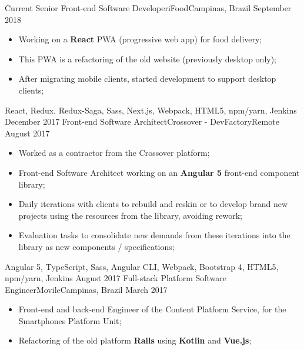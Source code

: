%
%
%

\begin{experiences}
  \experience
    {Current}   {Senior Front-end Software Developer}{iFood}{Campinas, Brazil}
    {September 2018} {
    \begin{itemize}
      \item Working on a \textbf{React} PWA (progressive web app) for food delivery;
      \item This PWA is a refactoring of the old website (previously desktop only);
      \item After migrating mobile clients, started development to support desktop clients;
    \end{itemize}
  }
  {React, Redux, Redux-Saga, Sass, Next.js, Webpack, HTML5, npm/yarn, Jenkins}
  \emptySeparator
  \experience
    {December 2017}   {Front-end Software Architect}{Crossover - DevFactory}{Remote}
    {August 2017} {
    \begin{itemize}
      \item Worked as a contractor from the Crossover platform;
      \item Front-end Software Architect working on an \textbf{Angular 5} front-end component library;
      \item Daily iterations with clients to rebuild and reskin or to develop brand new projects using the resources from the library, avoiding rework;
      \item Evaluation tasks to consolidate new demands from these iterations into the library as new components / specifications;
    \end{itemize}
  }
  {Angular 5, TypeScript, Sass, Angular CLI, Webpack, Bootstrap 4, HTML5, npm/yarn, Jenkins}
  \emptySeparator
  \experience
    {August 2017}   {Full-stack Platform Software Engineer}{Movile}{Campinas, Brazil}
    {March 2017} {
    \begin{itemize}
      \item Front-end and back-end Engineer of the Content Platform Service, for the Smartphones Platform Unit;
      \item Refactoring of the old platform \textbf{Rails} using \textbf{Kotlin} and \textbf{Vue.js};

\end{itemize}}
\end{experiences}
